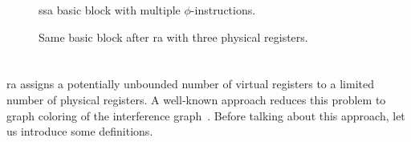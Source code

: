 \begin{figure}[ht]
\centering
\begin{minipage}{0.48\textwidth}
  \centering
  \caption{\gls{ssa} basic block with multiple $\phi$-instructions.}
  \label{fig:par1}
\end{minipage}
\hfill
\begin{minipage}{0.48\textwidth}
  \centering
  \caption{Same basic block after \gls{ra} with three physical registers.}
  \label{fig:par2}
\end{minipage}
\end{figure}

\section{}
\label{sec:ra}

\gls{ra} assigns a potentially unbounded number of virtual registers to a limited number of physical registers. A well-known approach reduces this problem to graph coloring of the interference graph~\cite{HGG:2006:RA-SSA}. Before talking about this approach, let us introduce some definitions.

